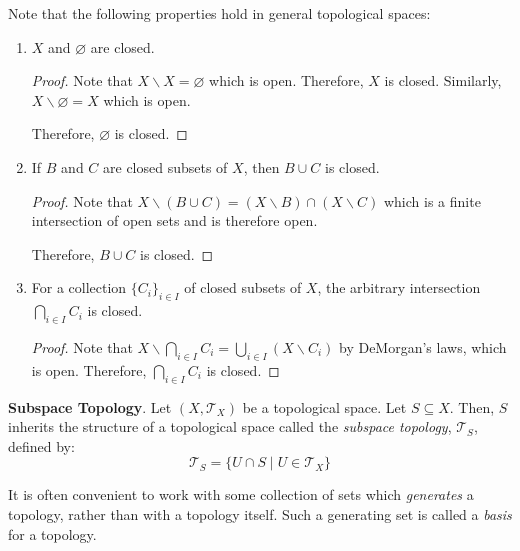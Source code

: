 Note that the following properties hold in general topological spaces:
\vspace{-1em}
\begin{enumerate}
\item $X$ and $\varnothing$ are closed. \begin{proof}
        Note that $X\backslash X = \varnothing$ which is open. Therefore, $X$ is closed. Similarly, $X\backslash \varnothing = X$ which is open. 
        
        Therefore, $\varnothing$ is closed.
    \end{proof}
    \item If $B$ and $C$ are closed subsets of $X$, then $B\cup C$ is closed. \begin{proof}
        Note that $X\backslash (B\cup C) =  (X\backslash B) \cap (X\backslash C)$ which is a finite intersection of open sets and is therefore open. 
        
        Therefore, $B\cup C$ is closed.
    \end{proof}
    \item For a collection $\{C_i\}_{i\in I}$ of closed subsets of $X$, the arbitrary intersection $\displaystyle\bigcap_{i\in I} C_i$ is closed. \begin{proof}
        Note that $X\backslash \displaystyle\bigcap_{i\in I} C_i = \displaystyle\bigcup_{i\in I} (X\backslash C_i)$ by DeMorgan's laws, which is open. Therefore, $\displaystyle\bigcap_{i\in I} C_i$ is closed.
    \end{proof}
\end{enumerate}

\begin{shaded}
    \textbf{Subspace Topology}. Let $(X,\mathcal{T}_X)$ be a topological space. Let $S\subseteq X$. Then, $S$ inherits the structure of a topological space called the \textit{subspace topology}, $\mathcal{T}_S$, defined by: \[\mathcal{T}_S = \{U\cap S\mid U\in\mathcal{T}_X\}\]
\end{shaded}

It is often convenient to work with some collection of sets which \textit{generates} a topology, rather than with a topology itself. Such a generating set is called a \textit{basis} for a topology.


